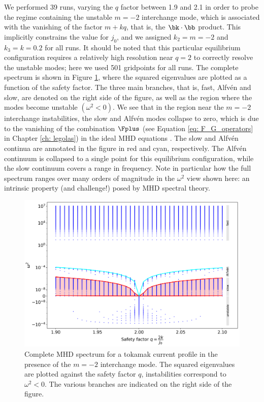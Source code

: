 We performed 39 runs, varying the $q$ factor between 1.9 and 2.1 in order to probe the regime containing the unstable $m = -2$ interchange mode, which is associated with the vanishing of the factor $m + kq$, that is, the $\bk \cdot \bb$ product. This implicitly constrains the value for $j_0$, and we assigned $k_2 = m = -2$ and $k_3 = k = 0.2$ for all runs. It should be noted that this particular equilibrium configuration requires a relatively high resolution near $q = 2$ to correctly resolve the unstable modes; here we used 501 gridpoints for all runs. The complete spectrum is shown in Figure \ref{fig: tokamak_current}, where the squared eigenvalues are plotted as a function of the safety factor. The three main branches, that is, fast, Alfv\'en and slow, are denoted on the right side of the figure, as well as the region where the modes become unstable $(\omega^2 < 0)$. We see that in the region near the $m = -2$ interchange instabilities, the slow and Alfv\'en modes collapse to zero, which is due to the vanishing of the combination $\Fplus$ (see Equation \eqref{eq: F_G_operators} in Chapter \ref{ch: legolas}) in the ideal MHD equations \citep{book_MHD}. The slow and Alfv\'en continua are annotated in the figure in red and cyan, respectively. The Alfv\'en continuum is collapsed to a single point for this equilibrium configuration, while the slow continuum covers a range in frequency. Note in particular how the full spectrum ranges over many orders of magnitude in the $\omega^2$ view shown here: an intrinsic property (and challenge!) posed by MHD spectral theory.

\begin{figure}[t]
  \centering
  \includegraphics[width=\textwidth]{kerner_tokamak.png}
  \caption{
    Complete MHD spectrum for a tokamak current profile in the presence of the $m = -2$ interchange mode. The squared eigenvalues are plotted against the safety factor $q$, instabilities correspond to $\omega^2 < 0$. The various branches are indicated on the right side of the figure.
  }
  \label{fig: tokamak_current}
\end{figure}

